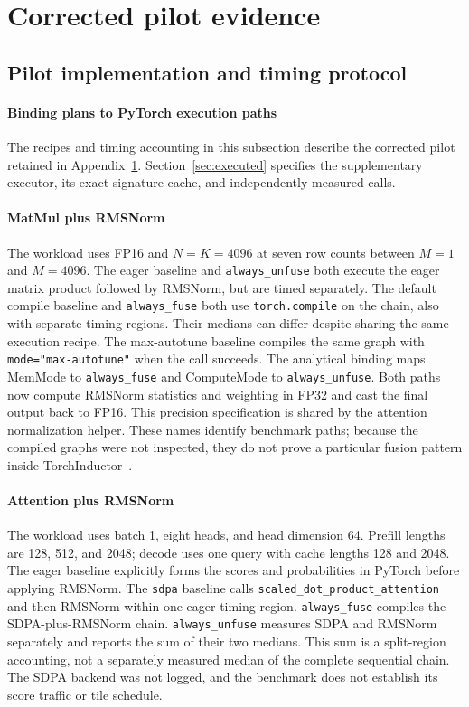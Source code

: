 \documentclass[a4paper,fleqn]{cas-dc}
\begin{document}
\section{Corrected pilot evidence}
\label{sec:pilot}

\subsection*{Pilot implementation and timing protocol}

\paragraph{Binding plans to PyTorch execution paths}

The recipes and timing accounting in this subsection describe the corrected pilot retained in Appendix~\ref{sec:pilot}.
Section~\ref{sec:executed} specifies the supplementary executor, its exact-signature cache, and independently measured calls.

\paragraph{MatMul plus RMSNorm}
The workload uses FP16 and $N{=}K{=}4096$ at seven row counts between $M{=}1$ and $M{=}4096$.
The eager baseline and \texttt{always\_unfuse} both execute the eager matrix product followed by RMSNorm, but are timed separately.
The default compile baseline and \texttt{always\_fuse} both use \texttt{torch.compile} on the chain, also with separate timing regions.
Their medians can differ despite sharing the same execution recipe.
The max-autotune baseline compiles the same graph with \texttt{mode="max-autotune"} when the call succeeds.
The analytical binding maps MemMode to \texttt{always\_fuse} and ComputeMode to \texttt{always\_unfuse}.
Both paths now compute RMSNorm statistics and weighting in FP32 and cast the final output back to FP16.
This precision specification is shared by the attention normalization helper.
These names identify benchmark paths; because the compiled graphs were not inspected, they do not prove a particular fusion pattern inside TorchInductor~\cite{Ansel2024PyTorch2}.

\paragraph{Attention plus RMSNorm}
The workload uses batch 1, eight heads, and head dimension 64.
Prefill lengths are 128, 512, and 2048; decode uses one query with cache lengths 128 and 2048.
The eager baseline explicitly forms the scores and probabilities in PyTorch before applying RMSNorm.
The \texttt{sdpa} baseline calls \texttt{scaled\_\allowbreak dot\_\allowbreak product\_\allowbreak attention} and then RMSNorm within one eager timing region.
\texttt{always\_fuse} compiles the SDPA-plus-RMSNorm chain.
\texttt{always\_unfuse} measures SDPA and RMSNorm separately and reports the sum of their two medians.
This sum is a split-region accounting, not a separately measured median of the complete sequential chain.
The SDPA backend was not logged, and the benchmark does not establish its score traffic or tile schedule.
\end{document}
